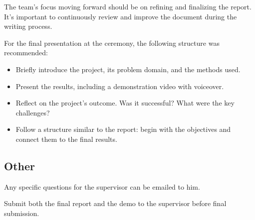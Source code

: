 The team’s focus moving forward should be on refining and finalizing the report. It's important to continuously review and improve the document during the writing process.

For the final presentation at the ceremony, the following structure was recommended:

\begin{itemize}
\item Briefly introduce the project, its problem domain, and the methods used.
\item Present the results, including a demonstration video with voiceover.
\item Reflect on the project’s outcome. Was it successful? What were the key challenges?
\item Follow a structure similar to the report: begin with the objectives and connect them to the final results.
\end{itemize}

\subsection{Other}
Any specific questions for the supervisor can be emailed to him.

Submit both the final report and the demo to the supervisor before final submission.



